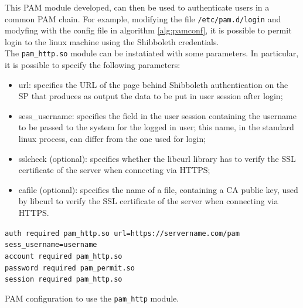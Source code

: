 This PAM module developed, can then be used to authenticate users in a common PAM chain.
For example, modifying the file \texttt{/etc/pam.d/login} and modyfing with the config file in algorithm \ref{alg:pamconf}, it is
possible to permit login to the linux machine using the Shibboleth credentials.\\
The \texttt{pam\_http.so} module can be instatiated with some parameters.
In particular, it is possible to specify the following parameters:
\begin{itemize}
\item url: specifies the URL of the page behind Shibboleth authentication on the SP that produces as output the data to be put in user
session after login;
\item sess\_username: specifies the field in the user session containing the username to be passed to the system for the logged in user;
this name, in the standard linux process, can differ from the one used for login;
\item sslcheck (optional): specifies whether the libcurl library has to verify the SSL certificate of the server when connecting via HTTPS;
\item cafile (optional): specifies the name of a file, containing a CA public key, used by libcurl to verify the SSL certificate of the server
when connecting via HTTPS.
\end{itemize}

\begin{algorithm}[t]
\SetAlgoNoLine
\texttt{auth     required       pam\_http.so url=https://servername.com/pam sess\_username=username}\\
\texttt{account  required       pam\_http.so}\\
\texttt{password required       pam\_permit.so}\\
\texttt{session  required       pam\_http.so}
\caption{PAM configuration to use the \texttt{pam\_http} module.}
\label{alg:pamconf}
\end{algorithm}

